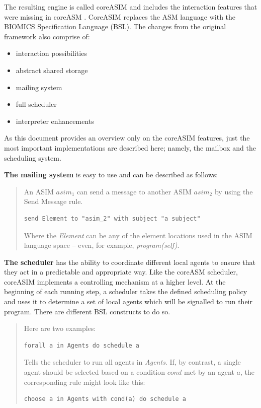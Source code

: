 The resulting engine is called coreASIM and includes the interaction features that were missing in coreASM \cite{BIOMICSD42}\cite{BIOMICSD52}. CoreASIM replaces the ASM language with the BIOMICS Specification Language (BSL). The changes from the original framework also comprise of:

\begin{itemize}
	\item interaction possibilities
	\item abstract shared storage
	\item mailing system
	\item full scheduler
	\item interpreter enhancements
\end{itemize}

As this document provides an overview only on the coreASIM features, just the most important implementations are described here; namely, the mailbox and the scheduling system.

\textbf{The mailing system} is easy to use and can be described as follows:
\begin{quote}
\small
An ASIM $asim_1$ can send a message to another ASIM $asim_2$ by using the Send Message rule.\nopagebreak
\begin{lstlisting}[language=bsl]
	send Element to "asim_2" with subject "a subject"
\end{lstlisting}
Where the \textit{Element} can be any of the element locations used in the ASIM language space -- even, for example, \textit{program(self)}.
\end{quote}

\textbf{The scheduler} has the ability to coordinate different local agents to ensure that they act in a predictable and appropriate way. Like the coreASM scheduler, coreASIM implements a controlling mechanism at a higher level. At the beginning of each running step, a scheduler takes the defined scheduling policy and uses it to determine a set of local agents which will be signalled to run their program. There are different BSL constructs to do so.
\begin{quote}
Here are two examples:
\begin{lstlisting}[language=bsl]
	forall a in Agents do schedule a
\end{lstlisting}
Tells the scheduler to run all agents in \textit{Agents}. If, by contrast, a single agent should be selected based on a condition $cond$ met by an agent $a$, the corresponding rule might look like this:
\begin{lstlisting}[language=bsl]
	choose a in Agents with cond(a) do schedule a
\end{lstlisting}
\end{quote}

